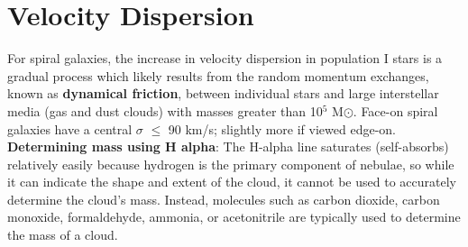 \section{Velocity Dispersion}

For spiral galaxies, the increase in velocity dispersion in population I stars is a gradual process which likely results from the random momentum exchanges, known as \textbf{dynamical friction}, between individual stars and large interstellar media (gas and dust clouds) with masses greater than 10$^5$ M$\odot$. Face-on spiral galaxies have a central $\sigma$ $\leq$ 90 km/s; slightly more if viewed edge-on.
\\

\textbf{Determining mass using H alpha}: The H-alpha line saturates (self-absorbs) relatively easily because hydrogen is the primary component of nebulae, so while it can indicate the shape and extent of the cloud, it cannot be used to accurately determine the cloud's mass. Instead, molecules such as carbon dioxide, carbon monoxide, formaldehyde, ammonia, or acetonitrile are typically used to determine the mass of a cloud.


